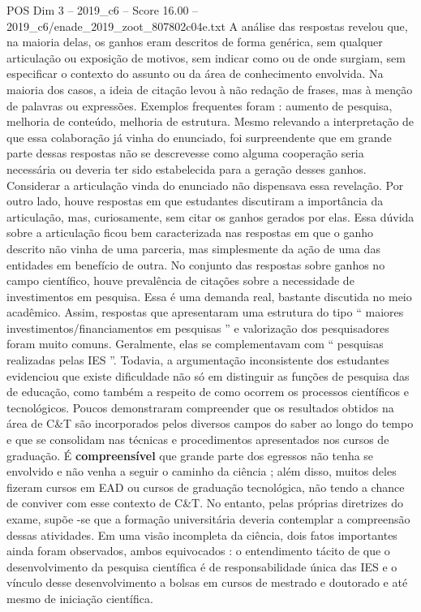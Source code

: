 \begin{textsample}{POS Dim 3 – 2019\_c6 – Score 16.00 – 2019\_c6/enade\_2019\_zoot\_807802c04e.txt}
A análise das respostas revelou que, na maioria delas, os ganhos eram descritos de forma genérica, sem qualquer articulação ou exposição de motivos, sem indicar como ou de onde surgiam, sem especificar o contexto do assunto ou da área de conhecimento envolvida.
Na maioria dos casos, a ideia de citação levou à não redação de frases, mas à menção de palavras ou expressões.
Exemplos frequentes foram : aumento de pesquisa, melhoria de conteúdo, melhoria de estrutura.
Mesmo relevando a interpretação de que essa colaboração já vinha do enunciado, foi surpreendente que em grande parte dessas respostas não se descrevesse como alguma cooperação seria necessária ou deveria ter sido estabelecida para a geração desses ganhos.
Considerar a articulação vinda do enunciado não dispensava essa revelação.
Por outro lado, houve respostas em que estudantes discutiram a importância da articulação, mas, curiosamente, sem citar os ganhos gerados por elas.
Essa dúvida sobre a articulação ficou bem caracterizada nas respostas em que o ganho descrito não vinha de uma parceria, mas simplesmente da ação de uma das entidades em benefício de outra.
No conjunto das respostas sobre ganhos no campo científico, houve prevalência de citações sobre a necessidade de investimentos em pesquisa.
Essa é uma demanda real, bastante discutida no meio acadêmico.
Assim, respostas que apresentaram uma estrutura do tipo “ maiores investimentos/financiamentos em pesquisas ” e valorização dos pesquisadores foram muito comuns.
Geralmente, elas se complementavam com “ pesquisas realizadas pelas IES ”.
Todavia, a argumentação inconsistente dos estudantes evidenciou que existe dificuldade não só em distinguir as funções de pesquisa das de educação, como também a respeito de como ocorrem os processos científicos e tecnológicos.
Poucos demonstraram compreender que os resultados obtidos na área de C\&T são incorporados pelos diversos campos do saber ao longo do tempo e que se consolidam nas técnicas e procedimentos apresentados nos cursos de graduação.
É \textbf{compreensível} que grande parte dos egressos não tenha se envolvido e não venha a seguir o caminho da ciência ; além disso, muitos deles fizeram cursos em EAD ou cursos de graduação tecnológica, não tendo a chance de conviver com esse contexto de C\&T.
No entanto, pelas próprias diretrizes do exame, supõe -se que a formação universitária deveria contemplar a compreensão dessas atividades.
Em uma visão incompleta da ciência, dois fatos importantes ainda foram observados, ambos equivocados : o entendimento tácito de que o desenvolvimento da pesquisa científica é de responsabilidade única das IES e o vínculo desse desenvolvimento a bolsas em cursos de mestrado e doutorado e até mesmo de iniciação científica.

\end{textsample}
